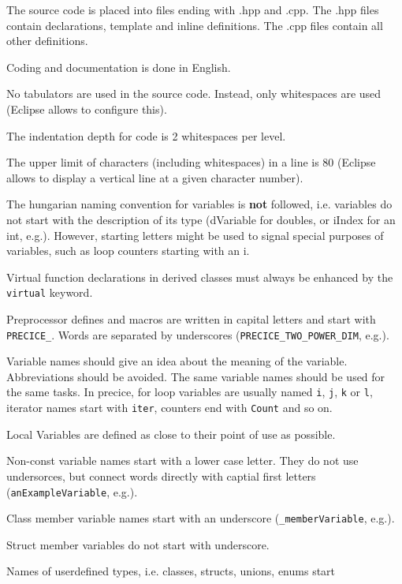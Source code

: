 \documentclass[11pt, oneside]{scrartcl}
\begin{document}
\begin{itemize*}
\item The source code is placed into files ending with .hpp and .cpp. The .hpp
files contain declarations, template and inline definitions. The .cpp files
contain all other definitions.
\item Coding and documentation is done in English.
\item No tabulators are used in the source code. Instead, only whitespaces are
used (Eclipse allows to configure this).
\item The indentation depth for code is 2 whitespaces per level.
\item The upper limit of characters (including whitespaces) in a line is 80
(Eclipse allows to display a vertical line at a given character number).
\item The hungarian naming convention for variables is \textbf{not} followed,
i.e. variables do not start with the description of its type (dVariable for
doubles, or iIndex for an int, e.g.). However, starting letters might be used
to signal special purposes of variables, such as loop counters starting with an
i.
\item Virtual function declarations in derived classes must always be enhanced
by the \texttt{virtual} keyword.
\item Preprocessor defines and macros are written in capital letters and start
with \texttt{PRECICE\_}. Words are separated by underscores
(\texttt{PRECICE\_TWO\_POWER\_DIM}, e.g.).
\item Variable names should give an idea about the meaning of the variable.
Abbreviations should be avoided. The same variable names should be used for the
same tasks. In precice, for loop variables are usually named \texttt{i},
\texttt{j}, \texttt{k} or \texttt{l}, iterator names start with \texttt{iter},
counters end with \texttt{Count} and so on.
\item Local Variables are defined as close to their point of use as possible.
\item Non-const variable names start with a lower case letter. They do not use
undersorces, but connect words directly with captial first letters
(\texttt{anExampleVariable}, e.g.).
\item Class member variable names start with an underscore
(\texttt{\_memberVariable}, e.g.).
\item Struct member variables do not start with underscore.
\item Names of userdefined types, i.e. classes, structs, unions, enums start

\end{itemize*}
\end{document}
